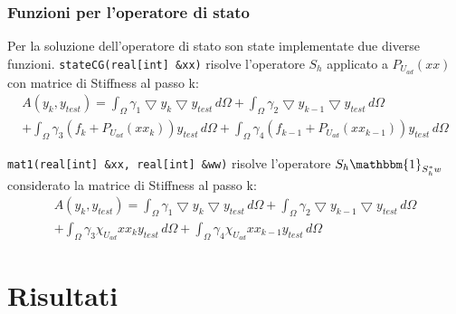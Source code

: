 \documentclass{beamer}
\theoremstyle{definition}
\theoremstyle{remark}
\theoremstyle{plain}
\theoremstyle{definition}
\begin{document}
\begin{frame}
\frametitle{Funzioni per l'operatore di stato}
Per la soluzione dell'operatore di stato son state implementate due diverse funzioni.
\texttt{stateCG(real[int] \&xx)} risolve l'operatore $S_h$ applicato a $P_{U_{ad}}(xx)$ con matrice di Stiffness al passo k:
\begin{multline*}
A(y_k,y_{test}) = \int_{\Omega} \gamma_1 \bigtriangledown y_k \bigtriangledown y_{test} \, d\Omega + \int_{\Omega} \gamma_2 \bigtriangledown y_{k-1} \bigtriangledown y_{test} \, d\Omega \\+ \int_{\Omega} \gamma_3 (f_{k}+P_{U_{ad}}(xx_k))y_{test} \, d\Omega + \int_{\Omega} \gamma_4 (f_{k-1}+P_{U_{ad}}(xx_{k-1}))y_{test} \, d\Omega
\end{multline*}

\texttt{mat1(real[int] \&xx, real[int] \&ww)} risolve l'operatore $S_h\mathbbm{1}_{S^*_hw}$ considerato la matrice di Stiffness al passo k:
\begin{multline*}
A(y_k,y_{test}) = \int_{\Omega} \gamma_1 \bigtriangledown y_k \bigtriangledown y_{test} \, d\Omega + \int_{\Omega} \gamma_2 \bigtriangledown y_{k-1} \bigtriangledown y_{test} \, d\Omega \\+ \int_{\Omega} \gamma_3 \chi_{U_{ad}}xx_k y_{test} \, d\Omega + \int_{\Omega} \gamma_4 \chi_{U_{ad}}xx_{k-1} y_{test} \, d\Omega
\end{multline*}

\end{frame}

\section{Risultati}
\end{document}
